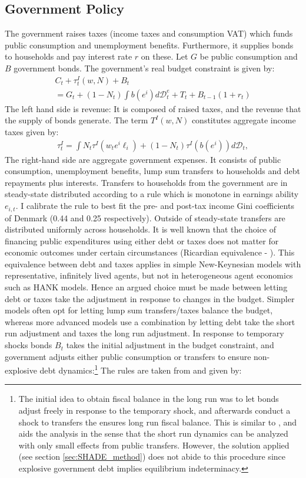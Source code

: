 \subsection{Government Policy}
The government raises taxes (income taxes and consumption VAT) which funds public consumption and unemployment benefits. Furthermore, it supplies bonds to households and pay interest rate $r$ on these. Let $G$ be public consumption and $B$ government bonds. The government's real budget constraint is given by:
\begin{gather}
C_{t} + \tau_{t}^{I}\left(w,N\right) + B_{t} \nonumber \\ 
=G_{t}+\left(1-N_{t}\right)\int b\left(e^{i}\right)d\mathcal{D}_{t}^{e}+T_{t}+B_{t-1}\left(1+r_{t}\right) \label{eq:G_budget}
\end{gather}
The left hand side is revenue: It is composed of raised taxes, and the revenue that the supply of bonds generate. The term $T^{I}\left(w,N\right)$ constitutes aggregate income taxes given by:
\begin{gather*}
\tau_{t}^{I}=\int N_{t}\tau^{I}\left(w_{t}e^{i}\ell_{i}\right)+\left(1-N_{t}\right)\tau^{I}\left(b(e^{i})\right)d\mathcal{D}_{t},
\end{gather*}
The right-hand side are aggregate government expenses. It consists of public consumption, unemployment benefits, lump sum transfers to households and debt repayments plus interests. Transfers to households from the government are in steady-state distributed according to a rule which is monotone in earnings ability $e_{i,t}$. I calibrate the rule to best fit the pre- and post-tax income Gini coefficients of Denmark (0.44 and 0.25 respectively). Outside of steady-state transfers are distributed uniformly across households. 
It is well known that the choice of financing public expenditures using either debt or taxes does not matter for economic outcomes under certain circumstances (Ricardian equivalence  - \citet{barro1974government}). This equivalence between debt and taxes applies in simple New-Keynesian models with representative, infinitely lived agents, but not in heterogeneous agent economics such as HANK models. Hence an argued choice must be made between letting debt or taxes take the adjustment in response to changes in the budget. Simpler models often opt for letting lump sum transfers/taxes balance the budget, whereas more advanced models use a combination by letting debt take the short run adjustment and taxes the long run adjustment. 
In response to temporary shocks bonds $B_t$ takes the initial adjustment in the budget constraint, and government adjusts either public consumption or transfers to ensure non-explosive debt dynamics:\footnote{The initial idea to obtain fiscal balance in the long run was to let bonds adjust freely in response to the temporary shock, and afterwards conduct a shock to transfers the ensures long run fiscal balance. This is similar to \citet{hagedorn2019fiscal}, and aids the analysis in the sense that the short run dynamics can be analyzed with only small effects from public transfers. However, the solution applied (see section \ref{sec:SHADE_method}) does not abide to this procedure since explosive government debt implies equilibrium indeterminacy.} The rules are taken from \citet{mckay2016role} and given by:
